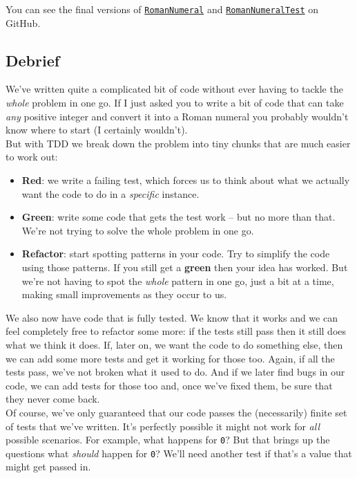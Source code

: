 You can see the final versions of \href{https://github.com/develop-me/bootcamp--laravel-project/blob/develop/app/RomanNumeral.php}{\texttt{RomanNumeral}} and \href{https://github.com/develop-me/bootcamp--laravel-project/blob/develop/tests/Unit/RomanNumeralTest.php}{\texttt{RomanNumeralTest}} on GitHub.


\subsection{Debrief}

We've written quite a complicated bit of code without ever having to tackle the \textit{whole} problem in one go. If I just asked you to write a bit of code that can take \textit{any} positive integer and convert it into a Roman numeral you probably wouldn't know where to start (I certainly wouldn't).
\\

But with TDD we break down the problem into tiny chunks that are much easier to work out:

\begin{itemize}
    \item \textbf{Red}: we write a failing test, which forces us to think about what we actually want the code to do in a \textit{specific} instance.
    \item \textbf{Green}: write some code that gets the test work – but no more than that. We're not trying to solve the whole problem in one go.
    \item \textbf{Refactor}: start spotting patterns in your code. Try to simplify the code using those patterns. If you still get a \textbf{green} then your idea has worked. But we're not having to spot the \textit{whole} pattern in one go, just a bit at a time, making small improvements as they occur to us.
\end{itemize}

We also now have code that is fully tested. We know that it works and we can feel completely free to refactor some more: if the tests still pass then it still does what we think it does. If, later on, we want the code to do something else, then we can add some more tests and get it working for those too. Again, if all the tests pass, we've not broken what it used to do. And if we later find bugs in our code, we can add tests for those too and, once we've fixed them, be sure that they never come back.
\\

Of course, we've only guaranteed that our code passes the (necessarily) finite set of tests that we've written. It's perfectly possible it might not work for \textit{all} possible scenarios. For example, what happens for \texttt{0}? But that brings up the questions what \textit{should} happen for \texttt{0}? We'll need another test if that's a value that might get passed in.
\\


